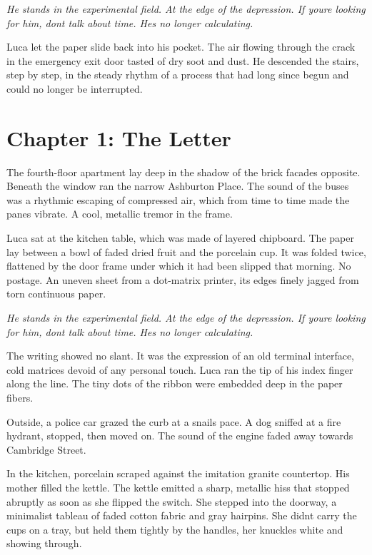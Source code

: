 \documentclass[
  ngerman,
]{article}
\begin{document}
\emph{He stands in the experimental field. At the edge of the
depression. If you\textquotesingle re looking for him,
don\textquotesingle t talk about time. He\textquotesingle s no longer
calculating.}

Luca let the paper slide back into his pocket. The air flowing through
the crack in the emergency exit door tasted of dry soot and dust. He
descended the stairs, step by step, in the steady rhythm of a process
that had long since begun and could no longer be interrupted.

\section{\texorpdfstring{\textbf{Chapter 1: The
Letter}}{Chapter 1: The Letter}}\label{chapter-1-the-letter}

The fourth-floor apartment lay deep in the shadow of the brick facades
opposite. Beneath the window ran the narrow Ashburton Place. The sound
of the buses was a rhythmic escaping of compressed air, which from time
to time made the panes vibrate. A cool, metallic tremor in the frame.

Luca sat at the kitchen table, which was made of layered chipboard. The
paper lay between a bowl of faded dried fruit and the porcelain cup. It
was folded twice, flattened by the door frame under which it had been
slipped that morning. No postage. An uneven sheet from a dot-matrix
printer, its edges finely jagged from torn continuous paper.

\emph{He stands in the experimental field. At the edge of the
depression. If you\textquotesingle re looking for him,
don\textquotesingle t talk about time. He\textquotesingle s no longer
calculating.}

The writing showed no slant. It was the expression of an old terminal
interface, cold matrices devoid of any personal touch. Luca ran the tip
of his index finger along the line. The tiny dots of the ribbon were
embedded deep in the paper fibers.

Outside, a police car grazed the curb at a snail\textquotesingle s pace.
A dog sniffed at a fire hydrant, stopped, then moved on. The sound of
the engine faded away towards Cambridge Street.

In the kitchen, porcelain scraped against the imitation granite
countertop. His mother filled the kettle. The kettle emitted a sharp,
metallic hiss that stopped abruptly as soon as she flipped the switch.
She stepped into the doorway, a minimalist tableau of faded cotton
fabric and gray hairpins. She didn\textquotesingle t carry the cups on a
tray, but held them tightly by the handles, her knuckles white and
showing through.
\end{document}
